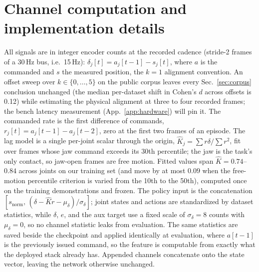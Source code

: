 \documentclass{article}
\begin{document}





\clearpage
\appendix

\section{Channel computation and implementation details}
\label{app:impl}

All signals are in integer encoder counts at the recorded cadence
(stride-2 frames of a 30\,Hz bus, i.e.\ 15\,Hz):
$\delta_j[t] = a_j[t{-}1] - s_j[t]$, where $a$ is the commanded and $s$
the measured position, the $k{=}1$ alignment convention. An offset sweep
over $k \in \{0, \dots, 5\}$ on the public corpus leaves every
Sec.~\ref{sec:corpus} conclusion unchanged (the median per-dataset shift
in Cohen's $d$ across offsets is 0.12) while estimating the physical
alignment at three to four recorded frames; the bench latency measurement
(App.~\ref{app:hardware}) will pin it. The commanded rate is the first difference of commands,
$r_j[t] = a_j[t{-}1] - a_j[t{-}2]$, zero at the first two frames of an
episode. The lag model is a single per-joint scalar through the origin,
$\hat{K}_j = \sum r\delta / \sum r^2$, fit over frames whose jaw command
exceeds its 30th percentile; the jaw is the task's only contact, so
jaw-open frames are free motion. Fitted values span
$\hat{K} = 0.74$--$0.84$ across joints on our training set (and move by at
most $0.09$ when the free-motion percentile criterion is varied from the
10th to the 50th), computed once on the training demonstrations and
frozen. The policy input
is the concatenation
$[s_{\text{norm}},\, (\delta - \hat{K} r - \mu_\delta)/\sigma_\delta]$;
joint states and actions are standardized by dataset statistics, while
$\delta$, $e$, and the aux target use a fixed scale of
$\sigma_\delta = 8$ counts with $\mu_\delta = 0$, so no channel statistic
leaks from evaluation. The same statistics are saved beside the
checkpoint and applied identically at evaluation, where $a[t{-}1]$ is the
previously issued command, so the feature is computable from exactly what
the deployed stack already has. Appended channels concatenate onto the
state vector, leaving the network otherwise unchanged.
\end{document}
